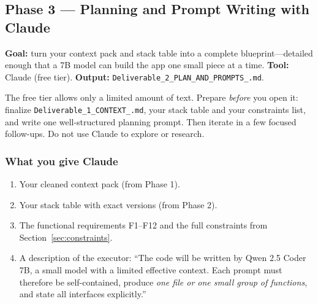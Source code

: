 \documentclass[11pt,a4paper]{article}
\newcommand{\uid}{[HeUserID]}
\newcommand{\dA}{\texttt{Deliverable\_1\_\allowbreak CONTEXT\_\allowbreak\uid.md}}
\newcommand{\dB}{\texttt{Deliverable\_2\_\allowbreak PLAN\_AND\_PROMPTS\_\allowbreak\uid.md}}
\begin{document}
\subsection{Phase 3 --- Planning and Prompt Writing with Claude}
\label{sec:phase3}
\textbf{Goal:} turn your context pack and stack table into a complete blueprint---detailed enough that a 7B model can build the app one small piece at a time. \textbf{Tool:} Claude (free tier). \textbf{Output:} \dB.

\begin{warnbox}
The free tier allows only a limited amount of text. Prepare \emph{before} you open it: finalize \dA, your stack table and your constraints list, and write one well-structured planning prompt. Then iterate in a few focused follow-ups. Do not use Claude to explore or research.
\end{warnbox}

\subsubsection{What you give Claude}
\begin{enumerate}
\item Your cleaned context pack (from Phase 1).
\item Your stack table with exact versions (from Phase 2).
\item The functional requirements F1--F12 and the full constraints from Section~\ref{sec:constraints}.
\item A description of the executor: ``The code will be written by Qwen 2.5 Coder 7B, a small model with a limited effective context. Each prompt must therefore be self-contained, produce \emph{one file or one small group of functions}, and state all interfaces explicitly.''
\end{enumerate}
\end{document}

